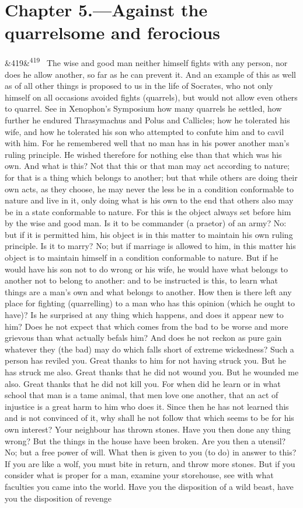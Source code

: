 \documentclass[12pt]{article}
\newcommand{\para}[1][]{\par\noindent\ifx&#1&\else\textsuperscript{\footnotesize #1}~\fi}
\begin{document}
\section*{Chapter 5.---Against the quarrelsome and ferocious}

\para[419] The wise and good man neither himself fights with any person, nor does he allow another, so far as he can prevent it. And an example of this as well as of all other things is proposed to us in the life of Socrates, who not only himself on all occasions avoided fights (quarrels), but would not allow even others to quarrel. See in Xenophon's Symposium how many quarrels he settled, how further he endured Thrasymachus and Polus and Callicles; how he tolerated his wife, and how he tolerated his son who attempted to confute him and to cavil with him. For he remembered well that no man has in his power another man's ruling principle. He wished therefore for nothing else than that which was his own. And what is this? Not that this or that man may act according to nature; for that is a thing which belongs to another; but that while others are doing their own acts, as they choose, he may never the less be in a condition conformable to nature and live in it, only doing what is his own to the end that others also may be in a state conformable to nature. For this is the object always set before him by the wise and good man. Is it to be commander (a praetor) of an army? No: but if it is permitted him, his object is in this matter to maintain his own ruling principle. Is it to marry? No; but if marriage is allowed to him, in this matter his object is to maintain himself in a condition conformable to nature. But if he would have his son not to do wrong or his wife, he would have what belongs to another not to belong to another: and to be instructed is this, to learn what things are a man's own and what belongs to another. How then is there left any place for fighting (quarrelling) to a man who has this opinion (which he ought to have)? Is he surprised at any thing which happens, and does it appear new to him? Does he not expect that which comes from the bad to be worse and more grievous than what actually befals him? And does he not reckon as pure gain whatever they (the bad) may do which falls short of extreme wickedness? Such a person has reviled you. Great thanks to him for not having struck you. But he has struck me also. Great thanks that he did not wound you. But he wounded me also. Great thanks that he did not kill you. For when did he learn or in what school that man is a tame animal, that men love one another, that an act of injustice is a great harm to him who does it. Since then he has not learned this and is not convinced of it, why shall he not follow that which seems to be for his own interest? Your neighbour has thrown stones. Have you then done any thing wrong? But the things in the house have been broken. Are you then a utensil? No; but a free power of will. What then is given to you (to do) in answer to this? If you are like a wolf, you must bite in return, and throw more stones. But if you consider what is proper for a man, examine your storehouse, see with what faculties you came into the world. Have you the disposition of a wild beast, have you the disposition of revenge 
\end{document}
